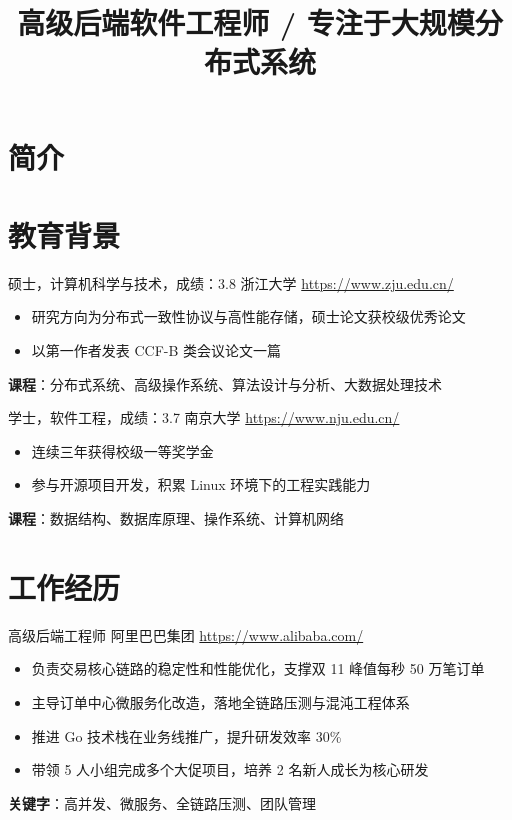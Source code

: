 \documentclass[a4paper, serif, 10pt]{moderncv}
\title{高级后端软件工程师 / 专注于大规模分布式系统}
\begin{document}
\maketitle

\section{简介}

\section{教育背景}

        {硕士，计算机科学与技术，成绩：3.8}
        {浙江大学}
        {\url{https://www.zju.edu.cn/}}
        {}
        {\begin{itemize}
\item 研究方向为分布式一致性协议与高性能存储，硕士论文获校级优秀论文
\item 以第一作者发表 CCF-B 类会议论文一篇
\end{itemize}
\textbf{课程}：分布式系统、高级操作系统、算法设计与分析、大数据处理技术}

        {学士，软件工程，成绩：3.7}
        {南京大学}
        {\url{https://www.nju.edu.cn/}}
        {}
        {\begin{itemize}
\item 连续三年获得校级一等奖学金
\item 参与开源项目开发，积累 Linux 环境下的工程实践能力
\end{itemize}
\textbf{课程}：数据结构、数据库原理、操作系统、计算机网络}
\section{工作经历}

        {高级后端工程师}
        {阿里巴巴集团}
        {\url{https://www.alibaba.com/}}
        {}
        {\begin{itemize}
\item 负责交易核心链路的稳定性和性能优化，支撑双 11 峰值每秒 50 万笔订单
\item 主导订单中心微服务化改造，落地全链路压测与混沌工程体系
\item 推进 Go 技术栈在业务线推广，提升研发效率 30\%
\item 带领 5 人小组完成多个大促项目，培养 2 名新人成长为核心研发
\end{itemize}
\textbf{关键字}：高并发、微服务、全链路压测、团队管理}
\end{document}
